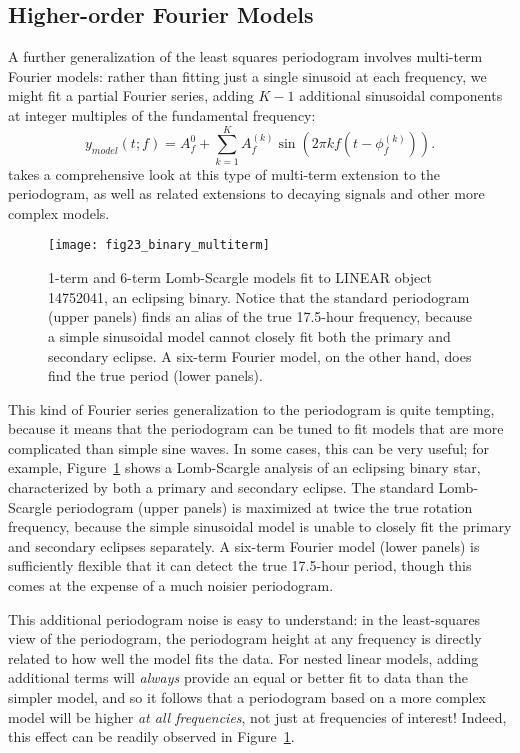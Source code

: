 \documentclass[preprint]{aastex}
\newcommand{\fig}[1]{Figure~\ref{fig:#1}}
\newcommand{\figlabel}[1]{\label{fig:#1}}
\newcommand{\sectlabel}[1]{\label{sect:#1}}
\begin{document}
\subsection{Higher-order Fourier Models}
\sectlabel{multiterm}

A further generalization of the least squares periodogram involves multi-term Fourier models:
rather than fitting just a single sinusoid at each frequency, we might fit a
partial Fourier series, adding $K-1$ additional sinusoidal components at
integer multiples of the fundamental frequency:
\begin{equation}
  y_{model}(t;f) = A_f^{0} + \sum_{k=1}^K A_f^{(k)} \sin(2\pi k f (t - \phi_f^{(k)})).
\end{equation}
\citet{Bretthorst88} takes a comprehensive look at this type of multi-term
extension to the periodogram, as well as related extensions to decaying signals
and other more complex models.

\begin{figure}[ht]
  \centering
  \texttt{[image: fig23\_binary\_multiterm]}
  \caption{1-term and 6-term Lomb-Scargle models fit to LINEAR object
    14752041, an eclipsing binary. Notice that the standard periodogram
    (upper panels) finds an alias of the true 17.5-hour frequency,
    because a simple sinusoidal model cannot closely fit both the primary
    and secondary eclipse. A six-term Fourier model, on
    the other hand, does find the true period (lower panels).
    \figlabel{binary-multiterm}}
\end{figure}

This kind of Fourier series generalization to the periodogram is quite
tempting, because it means that the periodogram can be tuned to fit models
that are more complicated than simple sine waves.
In some cases, this can be very useful; for example, \fig{binary-multiterm}
shows a Lomb-Scargle analysis of an eclipsing binary star, characterized by
both a primary and secondary eclipse.
The standard Lomb-Scargle periodogram (upper panels) is maximized at twice the true rotation
frequency, because the simple sinusoidal model is unable to closely fit the
primary and secondary eclipses separately.
A six-term Fourier model (lower panels) is sufficiently flexible that it can
detect the true 17.5-hour period, though this comes at the expense of a much
noisier periodogram.

This additional periodogram noise is easy to understand: in the least-squares
view of the periodogram, the periodogram height at any frequency is directly
related to how well the model fits the data.
For nested linear models, adding additional terms will {\it always} provide an
equal or better fit to data than the simpler model, and so it follows that
a periodogram based on a more complex model will be higher
{\it at all frequencies}, not just at frequencies of interest!
Indeed, this effect can be readily observed in \fig{binary-multiterm}.
\end{document}
